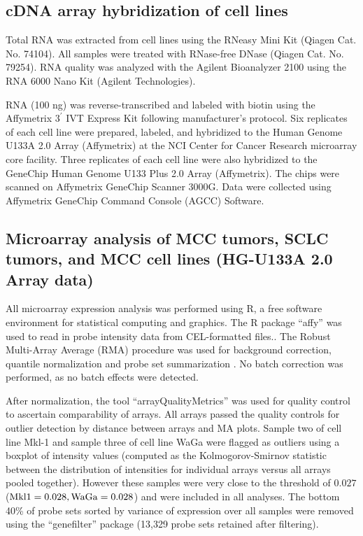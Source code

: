 \documentclass[10pt]{article}
\begin{document}
\subsection*{cDNA array hybridization of cell lines}

Total RNA was extracted from cell lines using the RNeasy Mini Kit (Qiagen Cat. No. 74104).
All samples were treated with RNase-free DNase (Qiagen Cat. No. 79254).
RNA quality was analyzed with the Agilent Bioanalyzer 2100 using the RNA 6000 Nano Kit (Agilent Technologies).

RNA (100 ng) was reverse-transcribed and labeled with biotin using the Affymetrix $3^{\prime}$ IVT Express Kit following manufacturer's protocol.
Six replicates of each cell line were prepared, labeled, and hybridized to the Human Genome U133A 2.0 Array (Affymetrix) at the NCI Center for Cancer Research microarray core facility.
Three replicates of each cell line were also hybridized to the GeneChip Human Genome U133 Plus 2.0 Array (Affymetrix).
The chips were scanned on Affymetrix GeneChip Scanner 3000G.
Data were collected using Affymetrix GeneChip Command Console (AGCC) Software.


\subsection*{Microarray analysis of MCC tumors, SCLC tumors, and MCC cell lines (HG-U133A 2.0 Array data)}

All microarray expression analysis was performed using R, a free software environment for statistical computing and graphics.
The R package ``affy'' \citep{Gautier2004Affyanalysis} was used to read in probe intensity data from CEL-formatted files..
The Robust Multi-Array Average (RMA) procedure was used for background correction, quantile normalization and probe set summarization \citep{Irizarry2003Exploration}.
No batch correction was performed, as no batch effects were detected.

After normalization, the tool ``arrayQualityMetrics'' was used for quality control to ascertain comparability of arrays.
All arrays passed the quality controls for outlier detection by distance between arrays and MA plots.
Sample two of cell line Mkl-1 and sample three of cell line WaGa were flagged as outliers using a boxplot of intensity values (computed as the Kolmogorov-Smirnov statistic between the distribution of intensities for individual arrays versus all arrays pooled together).
However these samples were very close to the threshold of $0.027$ ($\mathrm{Mkl\-1}=0.028,\mathrm{WaGa}=0.028$) and were included in all analyses.
The bottom 40\% of probe sets sorted by variance of expression over all samples were removed using the ``genefilter'' package (13,329 probe sets retained after filtering).
\end{document}
